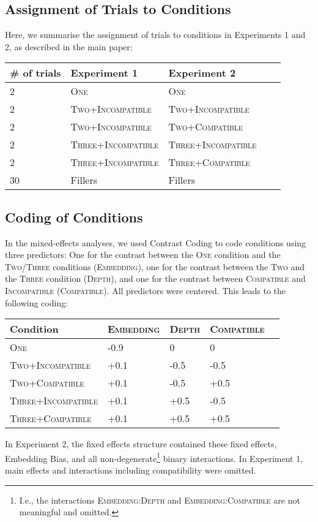 

\subsection{Assignment of Trials to Conditions}
Here, we summarise the assignment of trials to conditions in Experiments 1 and 2, as described in the main paper:

\begin{center}
\begin{tabular}{l|llll}
\# of trials	& Experiment 1 & Experiment 2 \\ \hline
	2 & \textsc{One}  & \textsc{One}\\ \hline
	2 & \textsc{Two+Incompatible} & \textsc{Two+Incompatible}\\
	2 & \textsc{Two+Incompatible} & \textsc{Two+Compatible}\\ \hline
	2 & \textsc{Three+Incompatible} & \textsc{Three+Incompatible}\\
	2 & \textsc{Three+Incompatible} & \textsc{Three+Compatible}\\ \hline
	30 & Fillers & Fillers \\ \hline
\end{tabular}
\end{center}


\subsection{Coding of Conditions}

In the mixed-effects analyses, we used Contrast Coding to code conditions using three predictors:
One for the contrast between the \textsc{One} condition and the \textsc{Two}/\textsc{Three} conditions (\textsc{Embedding}),
one for the contrast between the \textsc{Two} and the \textsc{Three} condition (\textsc{Depth}),
and one for the contrast between \textsc{Compatible} and \textsc{Incompatible} (\textsc{Compatible}).
All predictors were centered.
This leads to the following coding:
\begin{center}
\begin{tabular}{l|llll}
	Condition	             & \textsc{Embedding} & \textsc{Depth} & \textsc{Compatible} \\ \hline
	\textsc{One} & -0.9   & 0  & 0 \\
	\textsc{Two}+\textsc{Incompatible} &  +0.1  & -0.5 & -0.5\\
		\textsc{Two}+\textsc{Compatible}             &  +0.1     &  -0.5    & +0.5\\
	\textsc{Three}+\textsc{Incompatible} & +0.1   & +0.5 & -0.5\\
		\textsc{Three}+\textsc{Compatible}             &   +0.1    &  +0.5    & +0.5\\
\end{tabular}
\end{center}
In Experiment 2, the fixed effects structure contained these fixed effects, Embedding Bias, and all non-degenerate\footnote{I.e., the interactions \textsc{Embedding}:\textsc{Depth} and \textsc{Embedding}:\textsc{Compatible} are not meaningful and omitted.} binary interactions.
In Experiment 1, main effects and interactions including compatibility were omitted.

